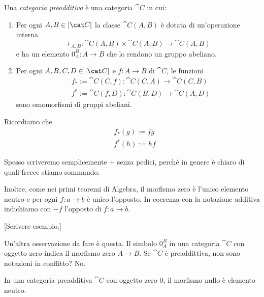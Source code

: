 \begin{definition}
  Una {\em categoria preadditiva} è una categoria \(\cat C\) in cui:
  \begin{enumerate}[leftmargin=*]
  \item Per ogni \(A, B \in \obj{\cat C}\) la classe \(\cat C(A, B)\) è
    dotata di un'operazione interna
    \[
      +_{A,B} : \cat C (A, B) \times \cat C (A, B) \to \cat C (A, B)
    \]
    e ha un elemento \(0_A^B : A \to B\) che lo rendono un gruppo
    abeliano.
  \item Per ogni \(A, B, C, D \in \obj{\cat C}\) e \(f : A \to B\) di
    \(\cat C\), le funzioni
    \begin{align*}
      & f_\ast := \cat C(C, f) : \cat C(C, A) \to \cat C(C, B) \\
      & f^\ast := \cat C(f, D) : \cat C(B, D) \to \cat C(A, D)
    \end{align*}
    sono omomorfismi di gruppi abeliani.
  \end{enumerate}
\end{definition}

\begin{recall}
  Ricordiamo che
  \begin{align*}
    & f_\ast(g) := f g \\
    & f^\ast(h) := h f
  \end{align*}
\end{recall}

Spesso scriveremo semplicemente \(+\) senza pedici, perché in genere è
chiaro di quali frecce stiamo sommando.

Inoltre, come nei primi teoremi di Algebra, il morfismo zero è l'unico
elemento neutro e per ogni \(f : a \to b\) è unico l'opposto. In
coerenza con la notazione additiva indichiamo con \(- f\) l'opposto di
\(f : a \to b\).

\begin{example}[\(\Modu_R\)] {\color{red} [Scrivere esempio.]}
\end{example}

Un'altra osservazione da fare è questa. Il simbolo \(0_A^B\) in una
categoria \(\cat C\) con oggetto zero indica il morfismo zero
\(A \to B\). Se \(\cat C\) è preaddittiva, non sono notazioni in
conflitto?  No.

\begin{proposition}
  In una categoria preadditiva \(\cat C\) con oggetto zero \(0\), il
  morfismo nullo è elemento neutro.
\end{proposition}

